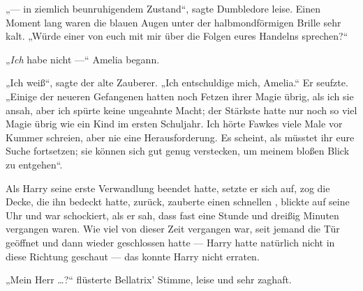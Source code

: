 „— in ziemlich beunruhigendem Zustand“, sagte Dumbledore leise. Einen Moment lang waren die blauen Augen unter der halbmondförmigen Brille sehr kalt.
„Würde einer von euch mit mir über die Folgen eures Handelns sprechen?“

„\emph{Ich} habe nicht —“ Amelia begann.

„Ich weiß“, sagte der alte Zauberer.
„Ich entschuldige mich, Amelia.“ Er seufzte.
„Einige der neueren Gefangenen hatten noch Fetzen ihrer Magie übrig, als ich sie ansah, aber ich spürte keine ungeahnte Macht; der Stärkste hatte nur noch so viel Magie übrig wie ein Kind im ersten Schuljahr. Ich hörte Fawkes viele Male vor Kummer schreien, aber nie eine Herausforderung. Es scheint, als müsstet ihr eure Suche fortsetzen; sie können sich gut genug verstecken, um meinem bloßen Blick zu entgehen“.

\later

Als Harry seine erste Verwandlung beendet hatte, setzte er sich auf, zog die Decke, die ihn bedeckt hatte, zurück, zauberte einen schnellen , blickte auf seine Uhr und war schockiert, als er sah, dass fast eine Stunde und dreißig Minuten vergangen waren. Wie viel von dieser Zeit vergangen war, seit jemand die Tür geöffnet und dann wieder geschlossen hatte — Harry hatte natürlich nicht in diese Richtung geschaut — das konnte Harry nicht erraten.

„Mein Herr …?“ flüsterte Bellatrix’ Stimme, leise und sehr zaghaft.


